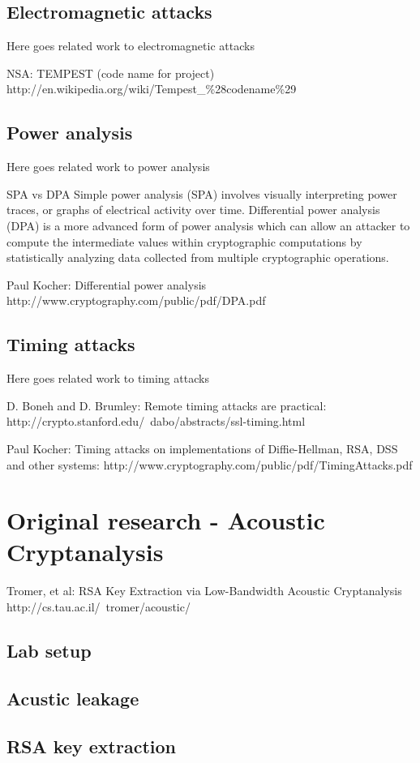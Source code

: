\subsection{Electromagnetic attacks}\label{sec:electromagnetic_attacks}

Here goes related work to electromagnetic attacks

NSA: TEMPEST (code name for project)
http://en.wikipedia.org/wiki/Tempest\_\%28codename\%29

\subsection{Power analysis}\label{sec:power_analysis}

Here goes related work to power analysis

SPA vs DPA
Simple power analysis (SPA) involves visually interpreting power traces, or graphs of electrical activity over time. 
Differential power analysis (DPA) is a more advanced form of power analysis which can allow an attacker to compute the intermediate values within cryptographic computations by statistically analyzing data collected from multiple cryptographic operations.

Paul Kocher: Differential power analysis
http://www.cryptography.com/public/pdf/DPA.pdf
\subsection{Timing attacks}\label{sec:timing_attacks}

Here goes related work to timing attacks

D. Boneh and D. Brumley: Remote timing attacks are practical:
http://crypto.stanford.edu/~dabo/abstracts/ssl-timing.html

Paul Kocher: Timing attacks on implementations of Diffie-Hellman, RSA, DSS and other systems:
http://www.cryptography.com/public/pdf/TimingAttacks.pdf

\section{Original research - Acoustic Cryptanalysis}\label{sec:original_research}

Tromer, et al: RSA Key Extraction via Low-Bandwidth Acoustic Cryptanalysis
http://cs.tau.ac.il/~tromer/acoustic/

\subsection{Lab setup}\label{sec:lab_setup}
\subsection{Acustic leakage}\label{sec:acustic_leakage}
\subsection{RSA key extraction}\label{sec:rsa_key_extraction}
